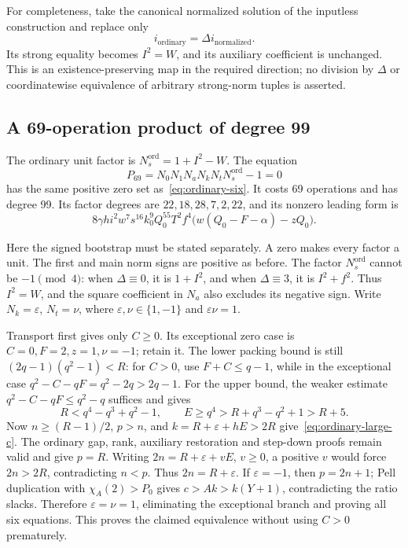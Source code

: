 For completeness, take the canonical normalized solution of the inputless
construction and replace only
\[
 i_{\mathrm{ordinary}}=\Delta i_{\mathrm{normalized}}.
\]
Its strong equality becomes \(I^2=W\), and its auxiliary coefficient is
unchanged. This is an existence-preserving map in the required direction;
no division by \(\Delta\) or coordinatewise equivalence of arbitrary
strong-norm tuples is asserted.

\subsection{A 69-operation product of degree 99}

The ordinary unit factor is \(N_s^{\mathrm{ord}}=1+I^2-W\). The equation
\begin{equation}\label{eq:ordinary-product69}
 \boxed{P_{69}=N_0N_1N_aN_kN_tN_s^{\mathrm{ord}}-1=0}
\end{equation}
has the same positive zero set as~\eqref{eq:ordinary-six}. It costs
69 operations and has degree 99. Its factor degrees are
\(22,18,28,7,2,22\), and its nonzero leading form is
\[
 8\gamma h i^2w^7s^{16}k_0^9Q_0^{55}T^2f^4
       \bigl(w(Q_0-F-\alpha)-zQ_0\bigr).
\]

Here the signed bootstrap must be stated separately. A zero makes every
factor a unit. The first and main norm signs are positive as before.
The factor \(N_s^{\mathrm{ord}}\) cannot be \(-1\pmod4\): when \(\Delta\equiv0\),
it is \(1+I^2\), and when \(\Delta\equiv3\), it is \(I^2+f^2\).
Thus \(I^2=W\), and the square coefficient in \(N_a\) also excludes
its negative sign. Write \(N_k=\varepsilon\), \(N_t=\nu\), where
\(\varepsilon,\nu\in\{1,-1\}\) and \(\varepsilon\nu=1\).

Transport first gives only \(C\ge0\). Its exceptional zero case is
\(C=0,F=2,z=1,\nu=-1\); retain it. The lower packing bound is still
\((2q-1)(q^2-1)<R\): for \(C>0\), use \(F+C\le q-1\), while in
the exceptional case \(q^2-C-qF=q^2-2q>2q-1\). For the upper bound,
the weaker estimate \(q^2-C-qF\le q^2-q\) suffices and gives
\[
 R<q^4-q^3+q^2-1,\qquad
 E\ge q^4>R+q^3-q^2+1>R+5.
\]
Now \(n\ge(R-1)/2\), \(p>n\), and \(k=R+\varepsilon+hE>2R\)
give~\eqref{eq:ordinary-large-c}. The ordinary gap, rank, auxiliary
restoration and step-down proofs remain valid and give \(p=R\).
Writing \(2n=R+\varepsilon+vE\), \(v\ge0\), a positive \(v\) would
force \(2n>2R\), contradicting \(n<p\). Thus \(2n=R+\varepsilon\).
If \(\varepsilon=-1\), then \(p=2n+1\); Pell duplication with
\(\chi_A(2)>P_0\) gives \(c>Ak>k(Y+1)\), contradicting the ratio
slacks. Therefore \(\varepsilon=\nu=1\), eliminating the exceptional
branch and proving all six equations. This proves the claimed equivalence
without using \(C>0\) prematurely.

